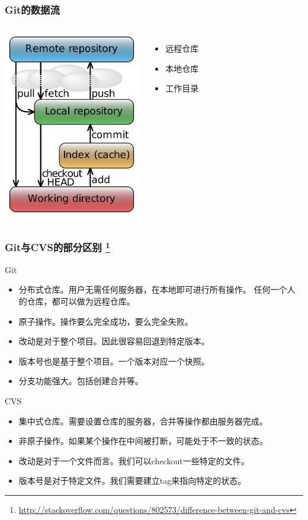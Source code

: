 \begin{frame}
    \frametitle{Git的数据流}
    \begin{columns}
        \column{6.0cm}
            \includegraphics[height=8cm,keepaspectratio]{data/GitDataFlowSimplified.png}
            \label{pic:DataFlow}
        \column{4.5cm}
            \begin{itemize}
                \item 远程仓库
                \item 本地仓库
                \item 工作目录
            \end{itemize}
    \end{columns}
\end{frame}

\begin{frame}
    \frametitle{Git与CVS的部分区别
        \footnote{\scriptsize \url{http://stackoverflow.com/questions/802573/difference-between-git-and-cvs}}}
    \begin{block}{Git}
        \begin{itemize}
            \item 分布式仓库。用户无需任何服务器，在本地即可进行所有操作。
                  任何一个人的仓库，都可以做为远程仓库。
            \item 原子操作。操作要么完全成功，要么完全失败。
            \item 改动是对于整个项目。因此很容易回退到特定版本。
            \item 版本号也是基于整个项目。一个版本对应一个快照。
            \item 分支功能强大。包括创建合并等。
        \end{itemize}
    \end{block}
    \begin{block}{CVS}
        \begin{itemize}
            \item 集中式仓库。需要设置仓库的服务器，合并等操作都由服务器完成。
            \item 非原子操作。如果某个操作在中间被打断，可能处于不一致的状态。
            \item 改动是对于一个文件而言。我们可以checkout一些特定的文件。
            \item 版本号是对于特定文件。我们需要建立tag来指向特定的状态。
        \end{itemize}
    \end{block}
\end{frame}

